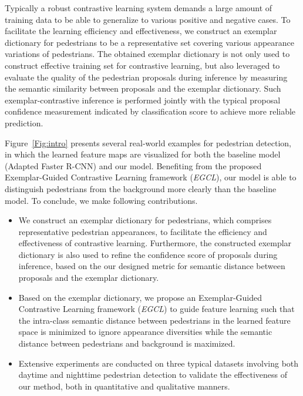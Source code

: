 \documentclass[journal]{IEEEtran}
\begin{document}
Typically a robust contrastive learning system demands a large amount of training data to be able to generalize to various positive and negative cases. To facilitate the learning efficiency and effectiveness, we construct an exemplar dictionary for pedestrians to be a representative set covering various appearance variations of pedestrians. The obtained exemplar dictionary is not only used to construct effective training set for contrastive learning, but also leveraged to evaluate the quality of the pedestrian proposals during inference by measuring the semantic similarity between proposals and the exemplar dictionary. Such exemplar-contrastive inference is performed jointly with the typical proposal confidence measurement indicated by classification score to achieve more reliable prediction.

Figure~\ref{Fig:intro} presents several real-world examples for pedestrian detection, in which the learned feature maps are visualized for both the baseline model (Adapted Faster R-CNN) and our model. Benefiting from the proposed Exemplar-Guided Contrastive Learning framework (\emph{EGCL}), our model is able to distinguish pedestrians from the background more clearly than the baseline model. To conclude, we make following contributions. 
\begin{itemize}
\item We construct an exemplar dictionary for pedestrians, which comprises representative pedestrian appearances, to facilitate the efficiency and effectiveness of contrastive learning. Furthermore, the constructed exemplar dictionary is also used to refine the confidence score of proposals during inference, based on the our designed metric for semantic distance between proposals and the exemplar dictionary.
\item Based on the exemplar dictionary, we propose an Exemplar-Guided Contrastive Learning framework (\emph{EGCL}) to guide feature learning such that the intra-class semantic distance between pedestrians in the learned feature space is minimized to ignore appearance diversities while the semantic distance between pedestrians and background is maximized. \leavevmode
\item Extensive experiments are conducted on
three typical datasets involving both daytime and nighttime pedestrian detection to validate the effectiveness of our method, both in quantitative and qualitative manners.
\end{itemize}\leavevmode
\vspace{-4pt} 
\end{document}
